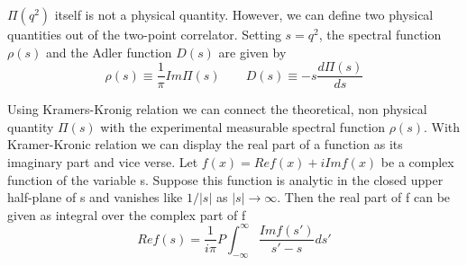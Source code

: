 \documentclass[11pt,a4paper]{article}
\begin{document}
$\Pi(q^2)$ itself is not a physical quantity. However, we can define two physical quantities out of the two-point correlator. Setting $s=q^2$, the spectral function $\rho(s)$ and the Adler function $D(s)$ are given by 
\begin{equation}
	\rho(s) \equiv \frac{1}{\pi} Im \Pi(s) \qquad D(s) \equiv -s \frac{d \Pi(s)}{ds}
\end{equation}

Using Kramers-Kronig relation we can connect the theoretical, non physical quantity $\Pi(s)$ with the experimental measurable spectral function $\rho(s)$. With Kramer-Kronic relation we can display the real part of a function as its imaginary part and vice verse. Let $f(x) = Re f(x) + i Im f(x)$ be a complex function of the variable s. Suppose this function is analytic in the closed upper half-plane of s and vanishes like $1/|s|$ as $|s| \rightarrow \infty$. Then the real part of f can be given as integral over the complex part of f
\begin{equation}
	Re f(s) = \frac{1}{i \pi} P \int_{-\infty}^{\infty} \frac{Im f(s')}{s' - s}ds'
\end{equation}
\end{document}
